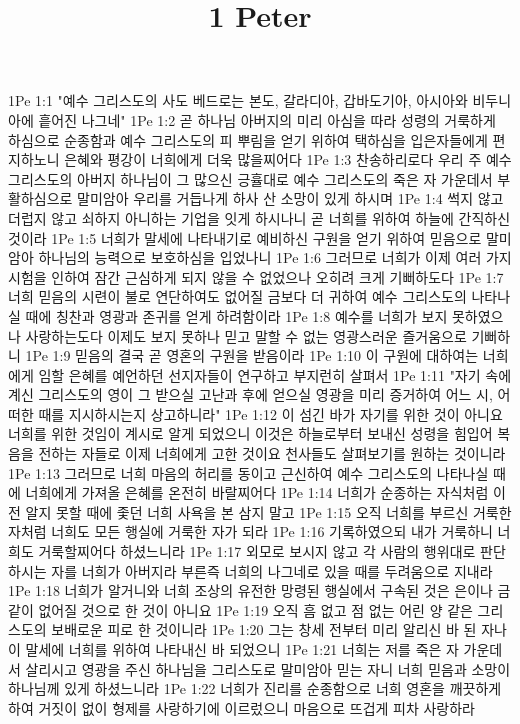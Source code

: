 

\title{1 Peter}

1Pe 1:1  "예수 그리스도의 사도 베드로는 본도, 갈라디아, 갑바도기아, 아시아와 비두니아에 흩어진 나그네"
1Pe 1:2  곧 하나님 아버지의 미리 아심을 따라 성령의 거룩하게 하심으로 순종함과 예수 그리스도의 피 뿌림을 얻기 위하여 택하심을 입은자들에게 편지하노니 은혜와 평강이 너희에게 더욱 많을찌어다
1Pe 1:3  찬송하리로다 우리 주 예수 그리스도의 아버지 하나님이 그 많으신 긍휼대로 예수 그리스도의 죽은 자 가운데서 부활하심으로 말미암아 우리를 거듭나게 하사 산 소망이 있게 하시며
1Pe 1:4  썩지 않고 더럽지 않고 쇠하지 아니하는 기업을 잇게 하시나니 곧 너희를 위하여 하늘에 간직하신 것이라
1Pe 1:5  너희가 말세에 나타내기로 예비하신 구원을 얻기 위하여 믿음으로 말미암아 하나님의 능력으로 보호하심을 입었나니
1Pe 1:6  그러므로 너희가 이제 여러 가지 시험을 인하여 잠간 근심하게 되지 않을 수 없었으나 오히려 크게 기뻐하도다
1Pe 1:7  너희 믿음의 시련이 불로 연단하여도 없어질 금보다 더 귀하여 예수 그리스도의 나타나실 때에 칭찬과 영광과 존귀를 얻게 하려함이라
1Pe 1:8  예수를 너희가 보지 못하였으나 사랑하는도다 이제도 보지 못하나 믿고 말할 수 없는 영광스러운 즐거움으로 기뻐하니
1Pe 1:9  믿음의 결국 곧 영혼의 구원을 받음이라
1Pe 1:10  이 구원에 대하여는 너희에게 임할 은혜를 예언하던 선지자들이 연구하고 부지런히 살펴서
1Pe 1:11  "자기 속에 계신 그리스도의 영이 그 받으실 고난과 후에 얻으실 영광을 미리 증거하여 어느 시, 어떠한 때를 지시하시는지 상고하니라"
1Pe 1:12  이 섬긴 바가 자기를 위한 것이 아니요 너희를 위한 것임이 계시로 알게 되었으니 이것은 하늘로부터 보내신 성령을 힘입어 복음을 전하는 자들로 이제 너희에게 고한 것이요 천사들도 살펴보기를 원하는 것이니라
1Pe 1:13  그러므로 너희 마음의 허리를 동이고 근신하여 예수 그리스도의 나타나실 때에 너희에게 가져올 은혜를 온전히 바랄찌어다
1Pe 1:14  너희가 순종하는 자식처럼 이전 알지 못할 때에 좇던 너희 사욕을 본 삼지 말고
1Pe 1:15  오직 너희를 부르신 거룩한 자처럼 너희도 모든 행실에 거룩한 자가 되라
1Pe 1:16  기록하였으되 내가 거룩하니 너희도 거룩할찌어다 하셨느니라
1Pe 1:17  외모로 보시지 않고 각 사람의 행위대로 판단하시는 자를 너희가 아버지라 부른즉 너희의 나그네로 있을 때를 두려움으로 지내라
1Pe 1:18  너희가 알거니와 너희 조상의 유전한 망령된 행실에서 구속된 것은 은이나 금같이 없어질 것으로 한 것이 아니요
1Pe 1:19  오직 흠 없고 점 없는 어린 양 같은 그리스도의 보배로운 피로 한 것이니라
1Pe 1:20  그는 창세 전부터 미리 알리신 바 된 자나 이 말세에 너희를 위하여 나타내신 바 되었으니
1Pe 1:21  너희는 저를 죽은 자 가운데서 살리시고 영광을 주신 하나님을 그리스도로 말미암아 믿는 자니 너희 믿음과 소망이 하나님께 있게 하셨느니라
1Pe 1:22  너희가 진리를 순종함으로 너희 영혼을 깨끗하게 하여 거짓이 없이 형제를 사랑하기에 이르렀으니 마음으로 뜨겁게 피차 사랑하라
